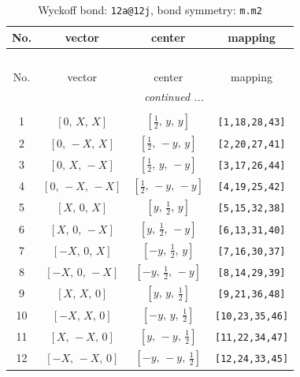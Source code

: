 \documentclass[fleqn,8pt]{jsarticle}
\begin{document}
\begin{longtable}{cccc}
\caption{Wyckoff bond: {\tt 12a@12j}, bond symmetry: {\tt m.m2}}
 \\
 \hline \hline
No. & vector & center & mapping \\ \hline \endfirsthead

\multicolumn{3}{l}{\tablename\ \thetable{}} \\
 \hline \hline
No. & vector & center & mapping \\ \hline \endhead

 \hline \hline
\multicolumn{3}{r}{\footnotesize\it continued ...} \\ \endfoot

 \hline \hline
\multicolumn{3}{r}{} \\ \endlastfoot

1 & $\left[ 0,\, X,\, X \right]$ & $\left[ \frac{1}{2},\, y,\, y \right]$ & {\tt [1,18,28,43]} \\ \hline
2 & $\left[ 0,\, - X,\, X \right]$ & $\left[ \frac{1}{2},\, - y,\, y \right]$ & {\tt [2,20,27,41]} \\ \hline
3 & $\left[ 0,\, X,\, - X \right]$ & $\left[ \frac{1}{2},\, y,\, - y \right]$ & {\tt [3,17,26,44]} \\ \hline
4 & $\left[ 0,\, - X,\, - X \right]$ & $\left[ \frac{1}{2},\, - y,\, - y \right]$ & {\tt [4,19,25,42]} \\ \hline
5 & $\left[ X,\, 0,\, X \right]$ & $\left[ y,\, \frac{1}{2},\, y \right]$ & {\tt [5,15,32,38]} \\ \hline
6 & $\left[ X,\, 0,\, - X \right]$ & $\left[ y,\, \frac{1}{2},\, - y \right]$ & {\tt [6,13,31,40]} \\ \hline
7 & $\left[ - X,\, 0,\, X \right]$ & $\left[ - y,\, \frac{1}{2},\, y \right]$ & {\tt [7,16,30,37]} \\ \hline
8 & $\left[ - X,\, 0,\, - X \right]$ & $\left[ - y,\, \frac{1}{2},\, - y \right]$ & {\tt [8,14,29,39]} \\ \hline
9 & $\left[ X,\, X,\, 0 \right]$ & $\left[ y,\, y,\, \frac{1}{2} \right]$ & {\tt [9,21,36,48]} \\ \hline
10 & $\left[ - X,\, X,\, 0 \right]$ & $\left[ - y,\, y,\, \frac{1}{2} \right]$ & {\tt [10,23,35,46]} \\ \hline
11 & $\left[ X,\, - X,\, 0 \right]$ & $\left[ y,\, - y,\, \frac{1}{2} \right]$ & {\tt [11,22,34,47]} \\ \hline
12 & $\left[ - X,\, - X,\, 0 \right]$ & $\left[ - y,\, - y,\, \frac{1}{2} \right]$ & {\tt [12,24,33,45]} \\
\end{longtable}
\end{document}
